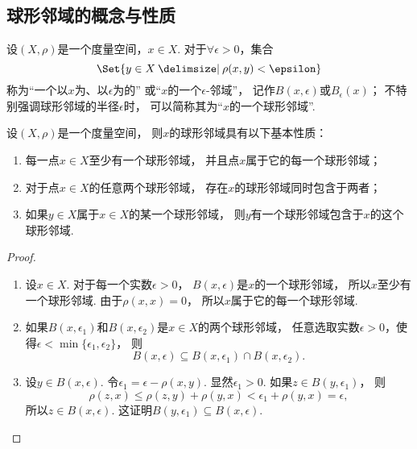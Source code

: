 \subsection{球形邻域的概念与性质}
\begin{definition}\label{definition:度量空间.球形邻域的概念}
设\((X,\rho)\)是一个度量空间，\(x \in X\).
对于\(\forall\epsilon>0\)，集合\[
	\Set{ y \in X \given \rho(x,y) < \epsilon }
\]
称为“一个以\(x\)为、以\(\epsilon\)为的”
或“\(x\)的一个\(\epsilon\)-邻域”，
记作\(B(x,\epsilon)\)或\(B_{\epsilon}(x)\)；
不特别强调球形邻域的半径\(\epsilon\)时，
可以简称其为“\(x\)的一个球形邻域”.
\end{definition}

\begin{theorem}\label{theorem:度量空间.球形邻域的性质}
设\((X,\rho)\)是一个度量空间，
则\(x\)的球形邻域具有以下基本性质：
\begin{enumerate}
	\item 每一点\(x \in X\)至少有一个球形邻域，
	并且点\(x\)属于它的每一个球形邻域；

	\item 对于点\(x \in X\)的任意两个球形邻域，
	存在\(x\)的球形邻域同时包含于两者；

	\item 如果\(y \in X\)属于\(x \in X\)的某一个球形邻域，
	则\(y\)有一个球形邻域包含于\(x\)的这个球形邻域.
\end{enumerate}
\begin{proof}
\begin{enumerate}
	\item 设\(x \in X\).
	对于每一个实数\(\epsilon>0\)，
	\(B(x,\epsilon)\)是\(x\)的一个球形邻域，
	所以\(x\)至少有一个球形邻域.
	由于\(\rho(x,x)=0\)，
	所以\(x\)属于它的每一个球形邻域.

	\item 如果\(B(x,\epsilon_1)\)和\(B(x,\epsilon_2)\)是\(x \in X\)的两个球形邻域，
	任意选取实数\(\epsilon>0\)，使得\(\epsilon<\min\{\epsilon_1,\epsilon_2\}\)，
	则\[
		B(x,\epsilon)
		\subseteq
		B(x,\epsilon_1) \cap B(x,\epsilon_2).
	\]

	\item 设\(y \in B(x,\epsilon)\).
	令\(\epsilon_1 = \epsilon - \rho(x,y)\).
	显然\(\epsilon_1>0\).
	如果\(z \in B(y,\epsilon_1)\)，
	则\[
		\rho(z,x)
		\leq \rho(z,y) + \rho(y,x)
		< \epsilon_1 + \rho(y,x)
		= \epsilon,
	\]
	所以\(z \in B(x,\epsilon)\).
	这证明\(B(y,\epsilon_1) \subseteq B(x,\epsilon)\).
	\qedhere
\end{enumerate}
\end{proof}
\end{theorem}

